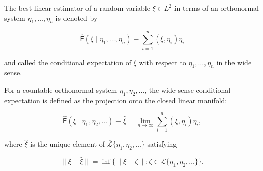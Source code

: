 The best linear estimator of a random variable $\xi \in L^2$ in terms of an orthonormal system $\eta_1, \ldots, \eta_n$ is denoted by

$$\hat{\mathsf{E}}(\xi \mid \eta_1, \ldots, \eta_n) \equiv \sum_{i=1}^{n} (\xi, \eta_i) \eta_i$$

and called the conditional expectation of $\xi$ with respect to $\eta_1, \ldots, \eta_n$ in the wide sense.

For a countable orthonormal system $\eta_1, \eta_2, \ldots$, the wide-sense conditional expectation is defined as the projection onto the closed linear manifold:

$$\hat{\mathsf{E}}(\xi \mid \eta_1, \eta_2, \ldots) \equiv \hat{\xi} = \lim_{n \to \infty} \sum_{i=1}^{n} (\xi, \eta_i) \eta_i,$$

where $\hat{\xi}$ is the unique element of $\overline{\mathcal{L}}\{\eta_1, \eta_2, \ldots\}$ satisfying

$$\|\xi - \hat{\xi}\| = \inf\{\|\xi - \zeta\| : \zeta \in \overline{\mathcal{L}}\{\eta_1, \eta_2, \ldots\}\}.$$
